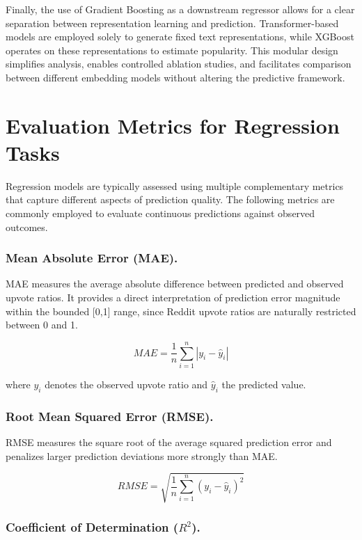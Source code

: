 Finally, the use of Gradient Boosting as a downstream regressor allows for a clear separation between representation learning and prediction. 
Transformer-based models are employed solely to generate fixed text representations, while XGBoost operates on these representations to estimate popularity. 
This modular design simplifies analysis, enables controlled ablation studies, and facilitates comparison between different embedding models without altering the predictive framework.

\section{Evaluation Metrics for Regression Tasks}
\label{sec:evaluation_metrics}

Regression models are typically assessed using multiple complementary metrics that capture different aspects of prediction quality. The following metrics are commonly employed to evaluate continuous predictions against observed outcomes.

\subsubsection*{Mean Absolute Error (MAE).}

MAE measures the average absolute difference between predicted and observed
upvote ratios. It provides a direct interpretation of prediction error magnitude
within the bounded [0,1] range, since Reddit upvote ratios are naturally
restricted between 0 and 1.

\begin{equation}
MAE = \frac{1}{n} \sum_{i=1}^{n} |y_i - \hat{y}_i|
\end{equation}

where $y_i$ denotes the observed upvote ratio and $\hat{y}_i$ the predicted value.

\subsubsection*{Root Mean Squared Error (RMSE).}

RMSE measures the square root of the average squared prediction error and
penalizes larger prediction deviations more strongly than MAE.

\begin{equation}
RMSE = \sqrt{\frac{1}{n}\sum_{i=1}^{n}(y_i - \hat{y}_i)^2}
\end{equation}

\subsubsection*{Coefficient of Determination ($R^2$).} 

